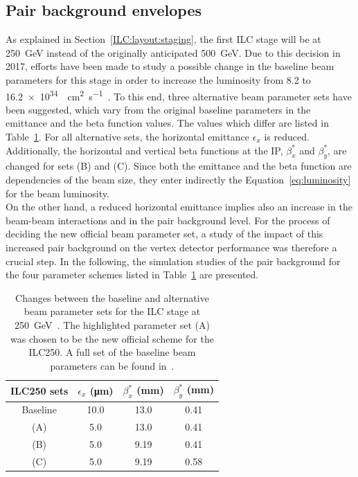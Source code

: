 \subsection{Pair background envelopes}
\label{PairBkg:envelopes}
As explained in Section~\ref{ILC:layout:staging}, the first ILC stage will be at \SI{250}{\GeV} instead of the originally anticipated \SI{500}{\GeV}.
Due to this decision in 2017, efforts have been made to study a possible change in the baseline beam parameters for this stage in order to increase the luminosity from \num{8.2} to \SI{16.2e34}{\per\centi\meter\squared\per\second}~\cite{LCWS17_paper}. 
To this end, three alternative beam parameter sets have been suggested, which vary from the original baseline parameters in the emittance and the beta function values.
The values which differ are listed in Table~\ref{tab:ILC250_sets}.
For all alternative sets, the horizontal emittance $\epsilon_x$ is reduced. 
Additionally, the horizontal and vertical beta functions at the IP, $\beta^*_x$ and $\beta^*_y$, are changed for sets (B) and (C).
Since both the emittance and the beta function are dependencies of the beam size, they enter indirectly the Equation~\ref{eq:luminosity} for the beam luminosity.
\\On the other hand, a reduced horizontal emittance implies also an increase in the beam-beam interactions and in the pair background level.
For the process of deciding the new official beam parameter set, a study of the impact of this increased pair background on the \sid vertex detector performance was therefore a crucial step.
In the following, the simulation studies of the pair background for the four parameter schemes listed in Table~\ref{tab:ILC250_sets} are presented.
\begin{table}
\caption[New ILC250 beam parameters]{Changes between the baseline and alternative beam parameter sets for the ILC stage at \SI[detect-all]{250}{\GeV}~\cite{LCWS17_paper}.
The highlighted parameter set (A) was chosen to be the new official scheme for the ILC250.
A full set of the baseline beam parameters can be found in~\cite[p. 11]{TDR1}.}
\label{tab:ILC250_sets}
\centering
\begin{tabularx}{0.48\textwidth}{c|ccc}
\hline\hline
\textbf{ILC250 sets} & $\epsilon_x$ (\si{\micro\meter}) & $\beta^*_x$ (\si{\milli\meter}) & $\beta^*_y$ (\si{\milli\meter})\\
\hline
 Baseline & 10.0 & 13.0 & 0.41\\
\rowcolor{Gray} (A) & 5.0 & 13.0 & 0.41\\
 (B) & 5.0 & 9.19 & 0.41\\
 (C) & 5.0 & 9.19 & 0.58\\
\hline\hline
\end{tabularx}
\end{table}

